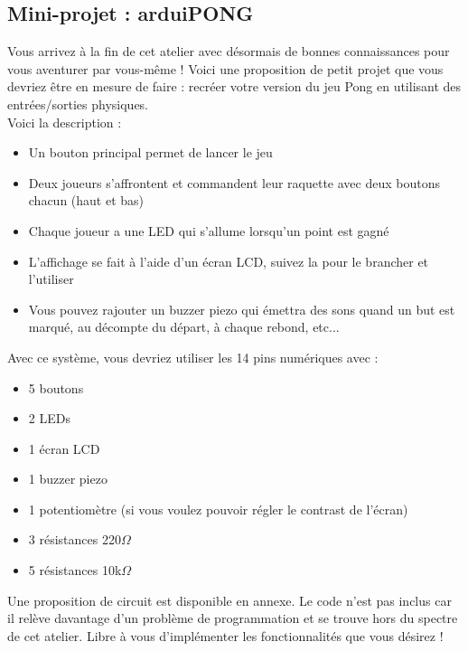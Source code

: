 \subsection{Mini-projet : arduiPONG}
Vous arrivez à la fin de cet atelier avec désormais de bonnes connaissances pour vous aventurer par vous-même !
Voici une proposition de petit projet que vous devriez être en mesure de faire : recréer votre version du jeu Pong en utilisant des entrées/sorties physiques.
\\
Voici la description :
\begin{itemize}
	\item Un bouton principal permet de lancer le jeu
	\item Deux joueurs s'affrontent et commandent leur raquette avec deux boutons chacun (haut et bas)
	\item Chaque joueur a une LED qui s'allume lorsqu'un point est gagné
	\item L'affichage se fait à l'aide d'un écran LCD, suivez la  pour le brancher et l'utiliser
	\item Vous pouvez rajouter un buzzer piezo qui émettra des sons quand un but est marqué, au décompte du départ, à chaque rebond, etc...
\end{itemize}

Avec ce système, vous devriez utiliser les 14 pins numériques avec :
\begin{itemize}
	\item 5 boutons
	\item 2 LEDs
	\item 1 écran LCD
	\item 1 buzzer piezo
	\item 1 potentiomètre (si vous voulez pouvoir régler le contrast de l'écran)
	\item 3 résistances 220$\Omega$
	\item 5 résistances 10k$\Omega$
\end{itemize}

Une proposition de circuit est disponible en annexe.
Le code n'est pas inclus car il relève davantage d'un problème de programmation et se trouve hors du spectre de cet atelier.
Libre à vous d'implémenter les fonctionnalités que vous désirez !